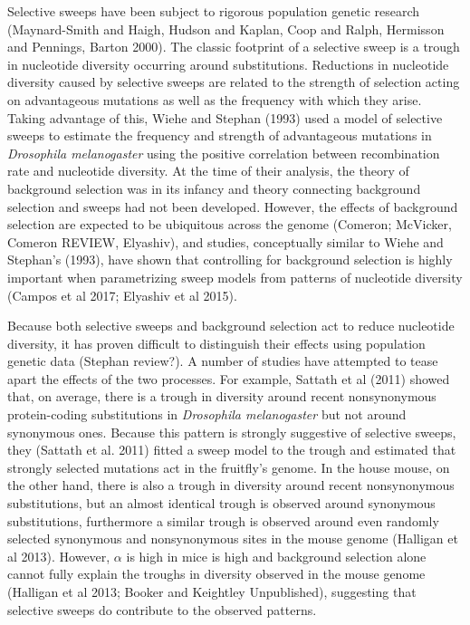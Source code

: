 \documentclass[11pt]{article}
\begin{document}
Selective sweeps have been subject to rigorous population genetic research (Maynard-Smith and Haigh, Hudson and Kaplan, Coop and Ralph, Hermisson and Pennings, Barton 2000). The classic footprint of a selective sweep is a trough in nucleotide diversity occurring around substitutions. Reductions in nucleotide diversity caused by selective sweeps are related to the strength of selection acting on advantageous mutations as well as the frequency with which they arise. Taking advantage of this, Wiehe and Stephan (1993) used a model of selective sweeps to estimate the frequency and strength of advantageous mutations in \textit{Drosophila melanogaster} using the positive correlation between recombination rate and nucleotide diversity. At the time of their analysis, the theory of background selection was in its infancy and theory connecting background selection and sweeps had not been developed. However, the effects of background selection are expected to be ubiquitous across the genome (Comeron; McVicker, Comeron REVIEW, Elyashiv), and studies, conceptually similar to Wiehe and Stephan's (1993), have shown that controlling for background selection is highly important when parametrizing sweep models from patterns of nucleotide diversity (Campos et al 2017; Elyashiv et al 2015).

Because both selective sweeps and background selection act to reduce nucleotide diversity, it has proven difficult to distinguish their effects using population genetic data (Stephan review?). A number of studies have attempted to tease apart the effects of the two processes. For example, Sattath et al (2011) showed that, on average, there is a trough in diversity around recent nonsynonymous protein-coding substitutions in \textit{Drosophila melanogaster} but not around synonymous ones. Because this pattern is strongly suggestive of selective sweeps, they (Sattath et al. 2011) fitted a sweep model to the trough and estimated that strongly selected mutations act in the fruitfly's genome.  In the house mouse, on the other hand, there is also a trough in diversity around recent nonsynonymous substitutions, but an almost identical trough is observed around synonymous substitutions, furthermore a similar trough is observed around even randomly selected synonymous and nonsynonymous sites in the mouse genome (Halligan et al 2013). However, $\alpha$ is high in mice is high and background selection alone cannot fully explain the troughs in diversity observed in the mouse genome (Halligan et al 2013; Booker and Keightley Unpublished), suggesting that selective sweeps do contribute to the observed patterns.
\end{document}
